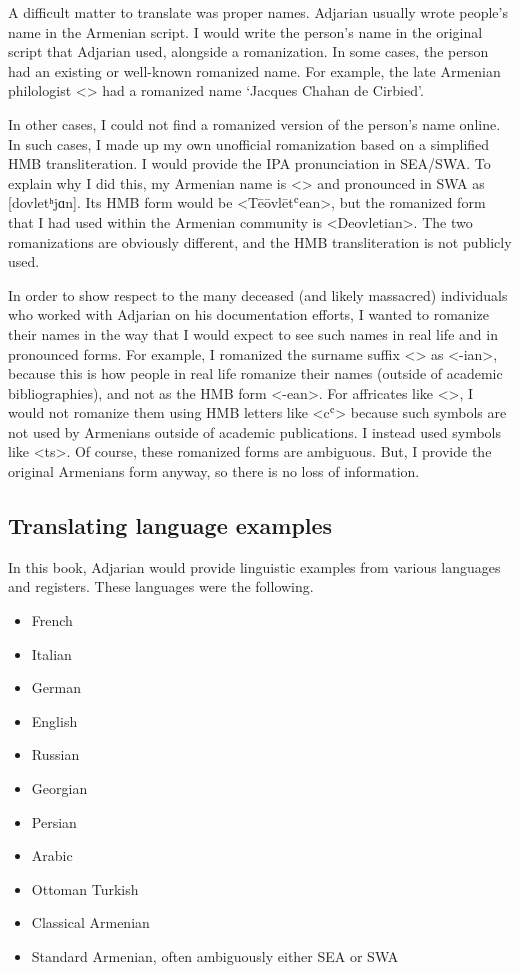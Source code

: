 \documentclass[output=paper]{langscibook}
\begin{document}
A difficult matter to translate was proper names. Adjarian usually wrote people's name in the Armenian script. I would write the person's name in the original script that Adjarian used, alongside a romanization. In some cases, the person had an existing or well-known romanized name. For example, the late Armenian philologist <> had a romanized name `Jacques Chahan de Cirbied'. 

In other cases, I could not find a romanized version of the  person's name online. In such cases, I made up my own unofficial romanization based on a simplified HMB transliteration. I would provide  the IPA pronunciation in SEA/SWA.  To explain why I did this, my Armenian name is <> and pronounced in SWA as [dovletʰjɑn]. Its HMB form would be <Tēōvlētʿean>, but the romanized form that I had used within the Armenian community is <Deovletian>.  The two romanizations are obviously different, and the HMB transliteration is not publicly used.

In order  to show respect to the many deceased (and likely massacred) individuals who worked with Adjarian on his documentation efforts, I wanted to romanize their names in the way that I would expect to see such names in real life and in pronounced forms.  For example, I romanized the surname suffix <> as <-ian>, because this is how people in real life romanize their names (outside of academic bibliographies), and not as the HMB form <-ean>. For affricates like <>, I would not romanize them using HMB letters like <cʿ> because such symbols are not used by Armenians outside of academic publications. I instead used symbols like <ts>. Of course, these romanized forms are ambiguous. But, I provide the original Armenians form anyway,  so there is no loss of information.


\subsection{Translating language examples}\label{sec:HossepIntro:translation:lang}

In this book, Adjarian would provide linguistic examples from various languages and registers. These languages were the following.

\begin{multicols}{2}
\begin{itemize}
\item French
\item Italian
\item German
\item English
\item Russian
\item Georgian
\item Persian
\item Arabic
\item Ottoman Turkish
\item Classical Armenian
\item Standard Armenian, often ambiguously either SEA or SWA
\end{itemize}
\end{multicols}
\end{document}
